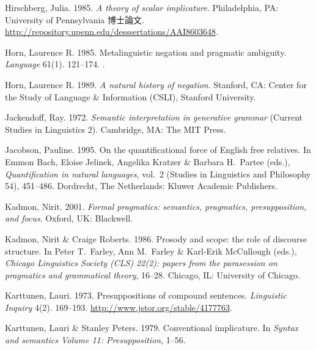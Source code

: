 \documentclass{goken}
\newcommand{\ori}[1]{\noindent\textcolor[gray]{0.7}{\fontsize{8pt}{8pt}\selectfont{\textsf{(p.~#1)}}} }
\begin{document}
\begin{thebibliography}{74}
\ori{66}

Hirschberg, Julia. 1985.
\newblock \emph{A theory of scalar implicature}.
\newblock Philadelphia, PA: University of Pennsylvania 博士論文.
\newblock
  \urlprefix\url{http://repository.upenn.edu/desssertations/AAI8603648}.

Horn, Laurence R. 1985.
\newblock Metalinguistic negation and pragmatic ambiguity.
\newblock \emph{Language} 61(1). 121--174.
\newblock {}.

Horn, Laurence R. 1989.
\newblock \emph{A natural history of negation}.
\newblock Stanford, CA: Center for the Study of Language \& Information (CSLI),
  Stanford University.

Jackendoff, Ray. 1972.
\newblock \emph{Semantic interpretation in generative grammar} (Current Studies
  in Linguistics 2).
\newblock Cambridge, MA: The MIT Press.

Jacobson, Pauline. 1995.
\newblock On the quantificational force of {E}nglish free relatives.
\newblock In Emmon Bach, Eloise Jelinek, Angelika Kratzer \& Barbara H.~Partee
  (eds.), \emph{Quantification in natural languages}, vol.~2 (Studies in
  Linguistics and Philosophy 54), 451--486. Dordrecht, The Netherlands: Kluwer
  Academic Publishers.

Kadmon, Nirit. 2001.
\newblock \emph{Formal pragmatics: semantics, pragmatics, presupposition, and
  focus}.
\newblock Oxford, UK: Blackwell.

Kadmon, Nirit \& Craige Roberts. 1986.
\newblock Prosody and scope: the role of discourse structure.
\newblock In Peter T.~Farley, Ann M.~Farley \& Karl-Erik McCullough (eds.),
\emph{Chicago {L}inguistics {S}ociety (CLS) 22(2): papers from the parasession
  on pragmatics and grammatical theory}, 16--28. Chicago, IL: University of
  Chicago.

Karttunen, Lauri. 1973.
\newblock Presuppositions of compound sentences.
\newblock \emph{Linguistic Inquiry} 4(2). 169--193.
\newblock \urlprefix\url{http://www.jstor.org/stable/4177763}.

Karttunen, Lauri \& Stanley Peters. 1979.
\newblock Conventional implicature.
\newblock In \emph{Syntax and semantics Volume 11: Presupposition}, 1--56.


\end{thebibliography}
\end{document}
